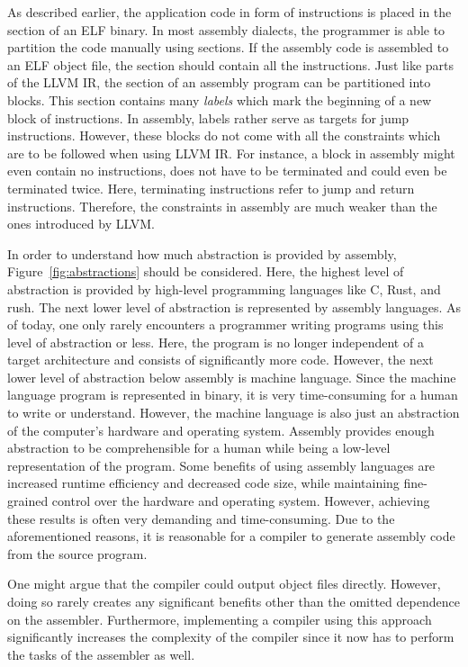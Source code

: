 As described earlier, the application code in form of instructions is placed in the  section of an ELF binary.
In most assembly dialects, the programmer is able to partition the code manually using sections.
If the assembly code is assembled to an ELF object file, the  section should contain all the instructions.
Just like parts of the LLVM IR, the  section of an assembly program can be partitioned into blocks.
This section contains many \emph{labels} which mark the beginning of a new block of instructions.
In assembly, labels rather serve as targets for jump instructions.
However, these blocks do not come with all the constraints which are to be followed when using LLVM IR\@.
For instance, a block in assembly might even contain no instructions, does not have to be terminated and could even be terminated twice.
Here, terminating instructions refer to jump and return instructions.
Therefore, the constraints in assembly are much weaker than the ones introduced by LLVM\@.

In order to understand how much abstraction is provided by assembly, Figure~\ref{fig:abstractions} should be considered.
Here, the highest level of abstraction is provided by high-level programming languages like C, Rust, and rush.
The next lower level of abstraction is represented by assembly languages.
As of today, one only rarely encounters a programmer writing programs using this level of abstraction or less.
Here, the program is no longer independent of a target architecture and consists of significantly more code.
However, the next lower level of abstraction below assembly is machine language.
Since the machine language program is represented in binary, it is very time-consuming for a human to write or understand.
However, the machine language is also just an abstraction of the computer's hardware and operating system.
Assembly provides enough abstraction to be comprehensible for a human while being a low-level representation of the program.
Some benefits of using assembly languages are increased runtime efficiency and decreased code size, while maintaining fine-grained control over the hardware and operating system.
However, achieving these results is often very demanding and time-consuming.
Due to the aforementioned reasons, it is reasonable for a compiler to generate assembly code from the source program.

One might argue that the compiler could output object files directly.
However, doing so rarely creates any significant benefits other than the omitted dependence on the assembler.
Furthermore, implementing a compiler using this approach significantly increases the complexity of the compiler since it now has to perform the tasks of the assembler as well.

